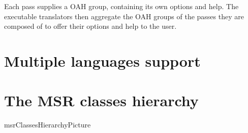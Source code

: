 \documentclass[12pt,a4paper]{article}
\begin{document}
Each pass supplies a OAH group, containing its own options and help. The executable translators then aggregate the OAH groups of the passes they are composed of to offer their options and help to the user.


\section{Multiple languages support}


\section{The MSR classes hierarchy}


 {msrClassesHierarchyPicture}



\end{document}

